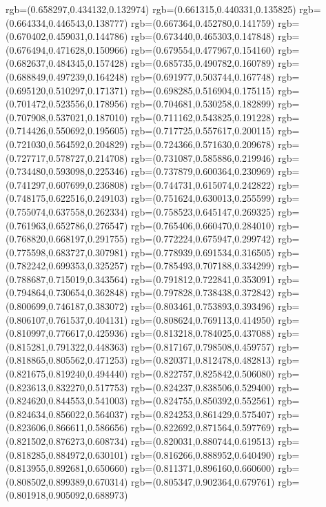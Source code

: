{{{			rgb=(0.658297,0.434132,0.132974)
			rgb=(0.661315,0.440331,0.135825)
			rgb=(0.664334,0.446543,0.138777)
			rgb=(0.667364,0.452780,0.141759)
			rgb=(0.670402,0.459031,0.144786)
			rgb=(0.673440,0.465303,0.147848)
			rgb=(0.676494,0.471628,0.150966)
			rgb=(0.679554,0.477967,0.154160)
			rgb=(0.682637,0.484345,0.157428)
			rgb=(0.685735,0.490782,0.160789)
			rgb=(0.688849,0.497239,0.164248)
			rgb=(0.691977,0.503744,0.167748)
			rgb=(0.695120,0.510297,0.171371)
			rgb=(0.698285,0.516904,0.175115)
			rgb=(0.701472,0.523556,0.178956)
			rgb=(0.704681,0.530258,0.182899)
			rgb=(0.707908,0.537021,0.187010)
			rgb=(0.711162,0.543825,0.191228)
			rgb=(0.714426,0.550692,0.195605)
			rgb=(0.717725,0.557617,0.200115)
			rgb=(0.721030,0.564592,0.204829)
			rgb=(0.724366,0.571630,0.209678)
			rgb=(0.727717,0.578727,0.214708)
			rgb=(0.731087,0.585886,0.219946)
			rgb=(0.734480,0.593098,0.225346)
			rgb=(0.737879,0.600364,0.230969)
			rgb=(0.741297,0.607699,0.236808)
			rgb=(0.744731,0.615074,0.242822)
			rgb=(0.748175,0.622516,0.249103)
			rgb=(0.751624,0.630013,0.255599)
			rgb=(0.755074,0.637558,0.262334)
			rgb=(0.758523,0.645147,0.269325)
			rgb=(0.761963,0.652786,0.276547)
			rgb=(0.765406,0.660470,0.284010)
			rgb=(0.768820,0.668197,0.291755)
			rgb=(0.772224,0.675947,0.299742)
			rgb=(0.775598,0.683727,0.307981)
			rgb=(0.778939,0.691534,0.316505)
			rgb=(0.782242,0.699353,0.325257)
			rgb=(0.785493,0.707188,0.334299)
			rgb=(0.788687,0.715019,0.343564)
			rgb=(0.791812,0.722841,0.353091)
			rgb=(0.794864,0.730654,0.362848)
			rgb=(0.797828,0.738438,0.372842)
			rgb=(0.800699,0.746187,0.383072)
			rgb=(0.803461,0.753893,0.393496)
			rgb=(0.806107,0.761537,0.404131)
			rgb=(0.808624,0.769113,0.414950)
			rgb=(0.810997,0.776617,0.425936)
			rgb=(0.813218,0.784025,0.437088)
			rgb=(0.815281,0.791322,0.448363)
			rgb=(0.817167,0.798508,0.459757)
			rgb=(0.818865,0.805562,0.471253)
			rgb=(0.820371,0.812478,0.482813)
			rgb=(0.821675,0.819240,0.494440)
			rgb=(0.822757,0.825842,0.506080)
			rgb=(0.823613,0.832270,0.517753)
			rgb=(0.824237,0.838506,0.529400)
			rgb=(0.824620,0.844553,0.541003)
			rgb=(0.824755,0.850392,0.552561)
			rgb=(0.824634,0.856022,0.564037)
			rgb=(0.824253,0.861429,0.575407)
			rgb=(0.823606,0.866611,0.586656)
			rgb=(0.822692,0.871564,0.597769)
			rgb=(0.821502,0.876273,0.608734)
			rgb=(0.820031,0.880744,0.619513)
			rgb=(0.818285,0.884972,0.630101)
			rgb=(0.816266,0.888952,0.640490)
			rgb=(0.813955,0.892681,0.650660)
			rgb=(0.811371,0.896160,0.660600)
			rgb=(0.808502,0.899389,0.670314)
			rgb=(0.805347,0.902364,0.679761)
			rgb=(0.801918,0.905092,0.688973)
}}}
